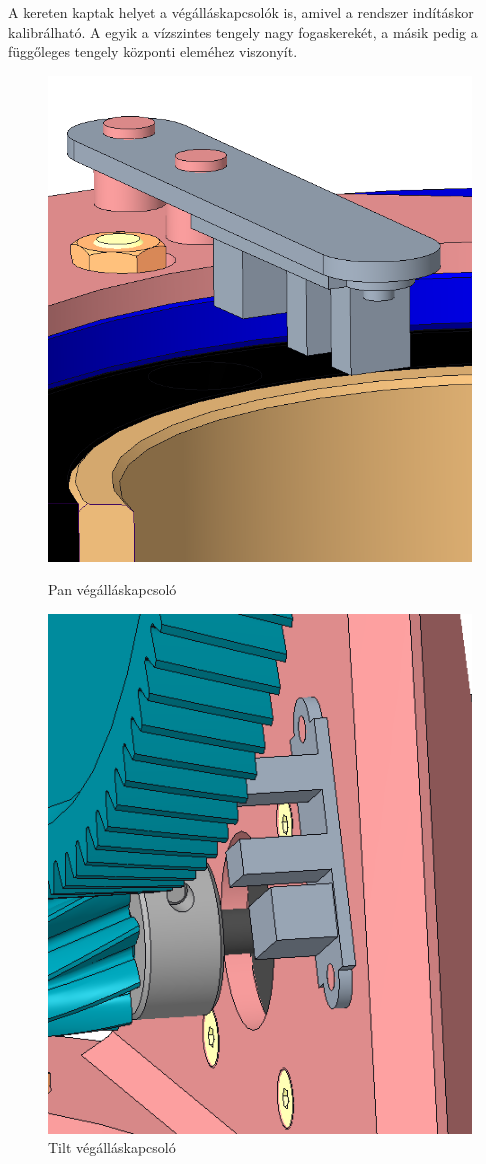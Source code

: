 \documentclass[12pt,a4paper]{article}
\begin{document}
A kereten kaptak helyet a végálláskapcsolók is, amivel a rendszer indításkor kalibrálható. A egyik a vízszintes tengely nagy fogaskerekét, a másik pedig a függőleges tengely központi eleméhez viszonyít.


\begin{figure}
	\centering
	\begin{minipage}{.5\textwidth}
		\centering
		\includegraphics[width=.7\linewidth]{mech_vegallas1}
		\caption{Pan végálláskapcsoló}
		\label{fig:mech_vegallas1}
	\end{minipage}%
	\begin{minipage}{.5\textwidth}
		\centering
		\includegraphics[width=.7\linewidth]{mech_vegallas2}
		\caption{Tilt végálláskapcsoló}
		\label{fig:mech_vegallas2}
	\end{minipage}
\end{figure}
\end{document}
